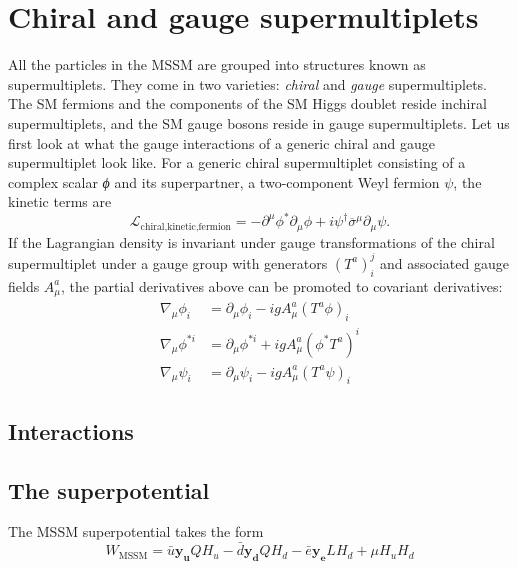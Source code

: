 \section{Chiral and gauge supermultiplets}
All the particles in the MSSM are grouped into structures known as supermultiplets. They come in two varieties: \emph{chiral} and \emph{gauge} supermultiplets. The SM fermions and the components of the SM Higgs doublet reside inchiral supermultiplets, and the SM gauge bosons reside in gauge supermultiplets. Let us first look at what the gauge interactions of a generic chiral and gauge supermultiplet look like.
For a generic chiral supermultiplet consisting of a complex scalar \emph{ϕ} and its superpartner, a two-component Weyl fermion $\psi$, the kinetic terms are 
\[\mathcal{L}_{\text{chiral,kinetic,fermion}} = -\partial^\mu\phi^*\partial_\mu\phi + i\psi^{\dagger}\overline{\sigma}^\mu\partial_\mu\psi.\]
If the Lagrangian density is invariant under gauge transformations of the chiral supermultiplet under a gauge group with generators $(T^a)_i^j$ and associated gauge fields $A_\mu^a$, the partial derivatives above can be promoted to covariant derivatives:
\begin{align}
  \nabla_\mu\phi_i &= \partial_\mu\phi_i - igA_\mu^a(T^a\phi)_i\label{eq:phi1}\\
  \nabla_\mu\phi^{*i} &= \partial_\mu\phi^{*i} + igA_\mu^a(\phi^*T^a)^{i}\label{eq:phi2}\\
  \nabla_\mu\psi_i &= \partial_\mu\psi_i - igA_\mu^a(T^a\psi)_i\label{eq:psi}
\end{align}

\subsection{Interactions}
\subsection{The superpotential}
The MSSM superpotential takes the form
\[W_\text{MSSM} = \bar{u}\mathbf{y_u}QH_u-\bar{d}\mathbf{y_d}Q H_d-\bar{e}\mathbf{y_e}L H_d+\mu H_u H_d \]

